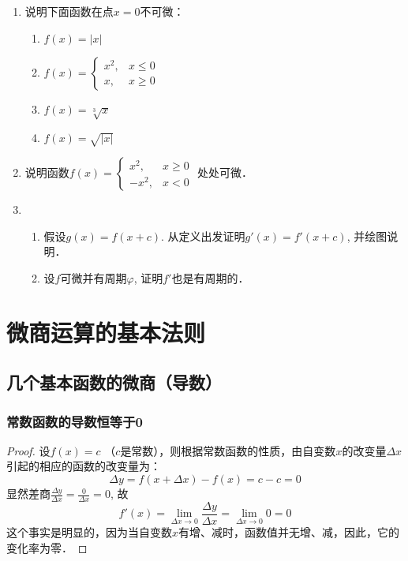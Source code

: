 \begin{ex}
\begin{enumerate}
    \item 说明下面函数在点$x=0$不可微：
\begin{multicols}{2}
\begin{enumerate}
    \item $f(x)=|x|$
    \item $f(x)=\begin{cases}
        x^2,& x\le 0\\
        x,& x\ge 0
    \end{cases}$
    \item $f(x)=\sqrt[3]{x}$
    \item $f(x)=\sqrt{|x|}$
\end{enumerate}
\end{multicols}
\item 说明函数$f(x)=\begin{cases}
    x^2,& x\ge 0\\
    -x^2,& x<0
\end{cases}$
    处处可微．
\item \begin{enumerate}
\item 假设$g(x)=f(x+c)$. 从定义出发证明$g'(x)=f'(x+c)$, 并绘图说明．    
\item 设$f$可微并有周期$\varphi$, 证明$f'$也是有周期的．
\end{enumerate}

\end{enumerate}
\end{ex}

\section{微商运算的基本法则}
\subsection{几个基本函数的微商（导数）}
\subsubsection{常数函数的导数恒等于0}

\begin{proof}
设$f(x)=c$ （$c$是常数），则根据常数函数的性质，由自变数$x$的改变量$\Delta x$引起的相应的函数的改变量为：
\[\Delta y=f (x+\Delta x) -f (x)=c-c=0\]
显然差商$\frac{\Delta y}{\Delta x}=\frac{0}{\Delta x}=0$, 故
\[f' (x) =\lim_{\Delta x\to 0}\frac{\Delta y}{\Delta x}=
\lim_{\Delta x\to 0} 0=0\]
这个事实是明显的，因为当自变数$x$有增、减时，函数值并无增、减，因此，它的变化率为零．
\end{proof}


